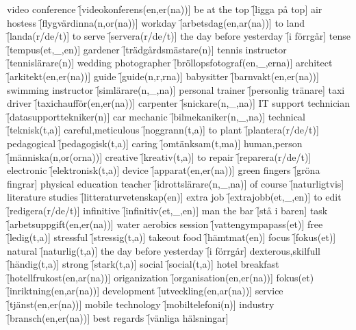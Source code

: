\begin{questions}
\begin{multicols}{2}
        \question video conference \f[videokonferens(en,er(na))]
        \question be at the top \f[ligga på top]
        \question air hostess \f[flygvärdinna(n,or(na))]
        \question workday \f[arbetsdag(en,ar(na))]
        \question to land \f[landa(r/de/t)]
        \question to serve \f[servera(r/de/t)]
        \question the day before yesterday \f[i förrgår]
        \question tense \f[tempus(et,\_,en)]
        \question gardener \f[trädgårdsmästare(n)]
        \question tennis instructor \f[tennislärare(n)]
        \question wedding photographer \f[bröllopsfotograf(en,\_,erna)]
        \question architect \f[arkitekt(en,er(na))]
        \question guide \f[guide(n,r,rna)]
        \question babysitter \f[barnvakt(en,er(na))]
        \question swimming instructor \f[simlärare(n,\_,na)]
        \question personal trainer \f[personlig tränare]
        \question taxi driver \f[taxichaufför(en,er(na))]
        \question carpenter \f[snickare(n,\_,na)]
        \question IT support technician \f[datasupporttekniker(n)]
        \question car mechanic \f[bilmekaniker(n,\_,na)]
        \question technical \f[teknisk(t,a)]
        \question careful,meticulous \f[noggrann(t,a)]
        \question to plant \f[plantera(r/de/t)]
        \question pedagogical \f[pedagogisk(t,a)]
        \question caring \f[omtänksam(t,ma)]
        \question human,person \f[människa(n,or(orna))]
        \question creative \f[kreativ(t,a)]
        \question to repair \f[reparera(r/de/t)]
        \question electronic \f[elektronisk(t,a)]
        \question device \f[apparat(en,er(na))]
        \question green fingers \f[gröna fingrar]
        \question physical education teacher \f[idrottslärare(n,\_,na)]
        \question of course \f[naturligtvis]
        \question literature studies \f[litteraturvetenskap(en)]
        \question extra job \f[extrajobb(et,\_,en)]
        \question to edit \f[redigera(r/de/t)]
        \question infinitive \f[infinitiv(et,\_,en)]
        \question man the bar \f[stå i baren]
        \question task \f[arbetsuppgift(en,er(na))]
        \question water aerobics session \f[vattengympapass(et)]
        \question free \f[ledig(t,a)]
        \question stressful \f[stressig(t,a)]
        \question takeout food \f[hämtmat(en)]
        \question focus \f[fokus(et)]
        \question natural \f[naturlig(t,a)]
        \question the day before yesterday \f[i förrgår]
        \question dexterous,skilfull \f[händig(t,a)]
        \question strong \f[stark(t,a)]
        \question social \f[social(t,a)]
        \question hotel breakfast \f[hotellfrukost(en,ar(na))]
        \question origanization \f[organisation(en,er(na))]
        \question fokus(et) \f[inriktning(en,ar(na))]
        \question development \f[utveckling(en,ar(na))]
        \question service \f[tjänst(en,er(na))]
        \question mobile technology \f[mobiltelefoni(n)]
        \question industry \f[bransch(en,er(na))]
        \question best regards \f[vänliga hälsningar]
    \end{multicols}
\end{questions}
